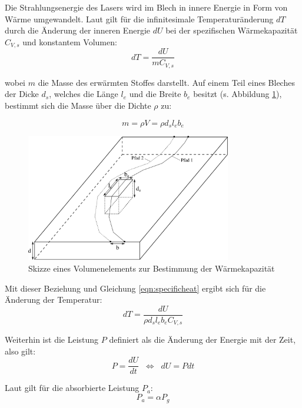 Die Strahlungsenergie des Lasers wird im Blech in innere Energie in Form von Wärme umgewandelt. Laut \cite{atkins} gilt für die infinitesimale Temperaturänderung $dT$ durch die Änderung der inneren Energie $dU$ bei der spezifischen Wärmekapazität $C_{V,s}$ und konstantem Volumen:
\begin{equation}
  dT = \frac{dU}{mC_{V,s}}
  \label{eqn:specificheat}
\end{equation}

wobei $m$ die Masse des erwärmten Stoffes darstellt. Auf einem Teil eines Bleches der Dicke $d_s$, welches die Länge $l_e$ und die Breite $b_e$ besitzt (s. Abbildung \ref{img:element}), bestimmt sich die Masse über die Dichte $\rho$ zu:

\begin{equation}
 m = \rho V = \rho d_s l_e b_e
 \label{eqn:massgeometry}
\end{equation}

\begin{figure}[!btp]
 \centering
 \includegraphics[width=0.8\textwidth]{images/element}
 \caption{Skizze eines Volumenelements zur Bestimmung der Wärmekapazität}
 \label{img:element}
\end{figure}

Mit dieser Beziehung und Gleichung \ref{eqn:specificheat} ergibt sich für die Änderung der Temperatur:
\begin{equation}
  dT = \frac{dU}{\rho d_s l_e b_eC_{V,s}}
  \label{eqn:tempgeometry}
\end{equation}

Weiterhin ist die Leistung $P$ definiert als die Änderung der Energie mit der Zeit, also gilt:
\begin{equation}
  P = \frac{dU}{dt}\;\;\Leftrightarrow\;\; dU = Pdt
  \label{eqn:definitionpower}
\end{equation}

Laut \cite{laserheating} gilt für die absorbierte Leistung $P_a$:
\begin{equation}
  P_a = \alpha P_g
  \label{eqn:absorptivity}
\end{equation}

